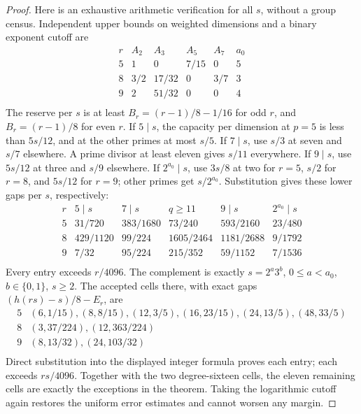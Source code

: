 \begin{proof}
Here is an exhaustive arithmetic verification for all $s$, without
a group census. Independent upper bounds on weighted dimensions and
a binary exponent cutoff are
\[
 \begin{array}{c|rrrr|r}
 r&A_2&A_3&A_5&A_7&a_0\\\hline
 5&1&0&7/15&0&5\\
 8&3/2&17/32&0&3/7&3\\
 9&2&51/32&0&0&4\\

 \end{array}
\]
The reserve per $s$ is at least $B_r=(r-1)/8-1/16$ for odd $r$,
and $B_r=(r-1)/8$ for even $r$. If $5\mid s$, the capacity per
dimension at $p=5$ is less than $5s/12$, and at the other primes
at most $s/5$. If $7\mid s$, use $s/3$ at seven and $s/7$
elsewhere. A prime divisor at least eleven gives $s/11$ everywhere.
If $9\mid s$, use $5s/12$ at three and $s/9$ elsewhere.
If $2^{a_0}\mid s$, use $3s/8$ at two for $r=5$, $s/2$
for $r=8$, and $5s/12$ for $r=9$; other primes get $s/2^{a_0}$.
Substitution gives these lower gaps per $s$, respectively:
\[
\begin{array}{c|rrrrr}
r&5\mid s&7\mid s&q\geq11&9\mid s&2^{a_0}\mid s\\\hline
5&31/720&383/1680&73/240&593/2160&23/480\\
8&429/1120&99/224&1605/2464&1181/2688&9/1792\\
9&7/32&95/224&215/352&59/1152&7/1536\\

\end{array}
\]
Every entry exceeds $r/4096$. The complement is exactly
$s=2^a3^b$, $0\leq a<a_0$, $b\in\{0,1\}$, $s\geq2$.
The accepted cells there, with exact gaps $(h(rs)-s)/8-E_r$, are
\[
\begin{array}{c|l}
5&(6,1/15),(8,8/15),(12,3/5),(16,23/15),(24,13/5),(48,33/5)\\
8&(3,37/224),(12,363/224)\\
9&(8,13/32),(24,103/32)\\

\end{array}
\]
Direct substitution into the displayed integer formula proves each
entry; each exceeds $rs/4096$. Together with the two degree-sixteen cells, the eleven remaining cells are exactly the exceptions in the theorem. Taking the logarithmic
cutoff again restores the uniform error estimates and cannot worsen
any margin.
\end{proof}

